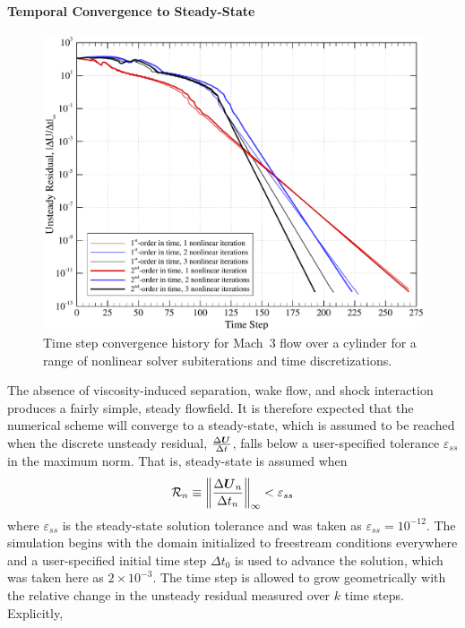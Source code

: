 \paragraph{Temporal Convergence to Steady-State}
\begin{figure}[hbtp]
  \begin{center}
    \includegraphics[width=\textwidth]{figures/mach3_cylinder/time_convergence}
    \caption{Time step convergence history for Mach~3 flow over a cylinder for a range of nonlinear solver subiterations and time discretizations.\label{fig:cyl_time_convergence}}
  \end{center}  
\end{figure}
The absence of viscosity-induced separation, wake flow, and shock interaction produces a fairly simple, steady flowfield.  It is therefore expected that the numerical scheme will converge to a steady-state, which is assumed to be reached when the discrete unsteady residual, $\frac{\Delta {\boldsymbol{U}}}{\Delta t}$, falls below a user-specified tolerance  $\varepsilon_{ss}$ in the maximum norm.  That is, steady-state is assumed when
\begin{equation}
  \mathcal{R}_n \equiv \left\|\frac{\Delta {\boldsymbol{U}}_n}{\Delta t_n}\right\|_{\infty} < \varepsilon_{ss}
\end{equation}
where $\varepsilon_{ss}$ is the steady-state solution tolerance and was taken as $\varepsilon_{ss}=10^{-12}$.
The simulation begins with the domain initialized to freestream conditions everywhere and a user-specified initial time step $\Delta t_0$ is used to advance the solution, which was taken here as $2\times 10^{-3}$.  The time step is allowed to grow geometrically with the relative change in the unsteady residual measured over $k$ time steps.  Explicitly, 
